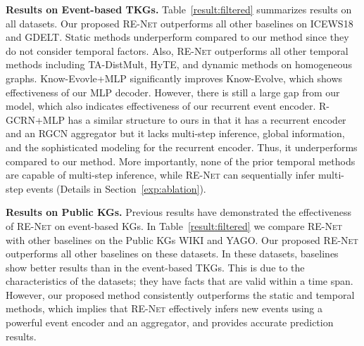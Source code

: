 \documentclass[11pt,a4paper]{article}
\newcommand{\method}{\textsc{RE-Net}\xspace}
\newcommand{\para}[1]{\smallskip\noindent\textbf{#1}}
\begin{document}
\para{Results on Event-based TKGs.}
Table~\ref{result:filtered} summarizes results on all datasets. 
Our proposed \method outperforms all other baselines on ICEWS18 and GDELT.
Static methods underperform compared to our method since they do not consider temporal factors.
Also, \method outperforms all other temporal methods including TA-DistMult, HyTE, and dynamic methods on homogeneous graphs.
Know-Evovle+MLP significantly improves Know-Evolve, which shows effectiveness of our MLP decoder.
However, there is still a large gap from our model, which also indicates effectiveness of our recurrent event encoder. 
R-GCRN+MLP has a similar structure to ours in that it has a recurrent encoder and an RGCN aggregator but it lacks multi-step inference, global information, and the sophisticated modeling for the recurrent encoder. Thus, it underperforms compared to our method.
More importantly, none of the prior temporal methods are capable of multi-step inference, while \method can sequentially infer multi-step events (Details in Section~\ref{exp:ablation}).






\para{Results on Public KGs.}
Previous results have demonstrated the effectiveness of \method on event-based KGs. In Table~\ref{result:filtered} we compare \method with other baselines on the Public KGs  WIKI and YAGO.
Our proposed \method outperforms all other baselines on these datasets. 
In these datasets, baselines show better results than in the event-based TKGs.
This is due to the characteristics of the datasets; they have facts that are valid within a time span. 
However, our proposed method consistently outperforms the static and temporal methods, which implies that \method effectively infers new events using a powerful event encoder and an aggregator, and provides accurate prediction results.
\end{document}
